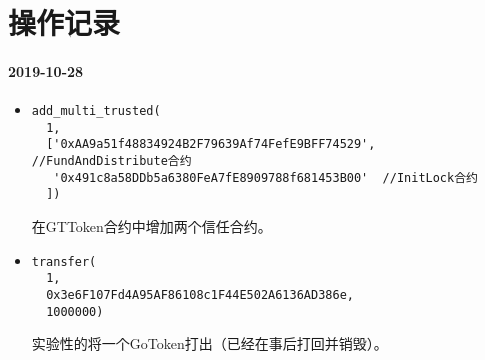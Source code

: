 \section{操作记录}
\paragraph{2019-10-28}
\begin{itemize}
\item \begin{verbatim}
add_multi_trusted(
  1,
  ['0xAA9a51f48834924B2F79639Af74FefE9BFF74529', //FundAndDistribute合约
   '0x491c8a58DDb5a6380FeA7fE8909788f681453B00'  //InitLock合约
  ])
\end{verbatim}
在GTToken合约中增加两个信任合约。
\item \begin{verbatim}
transfer(
  1, 
  0x3e6F107Fd4A95AF86108c1F44E502A6136AD386e,
  1000000)
\end{verbatim}
实验性的将一个GoToken打出（已经在事后打回并销毁）。
\end{itemize}

